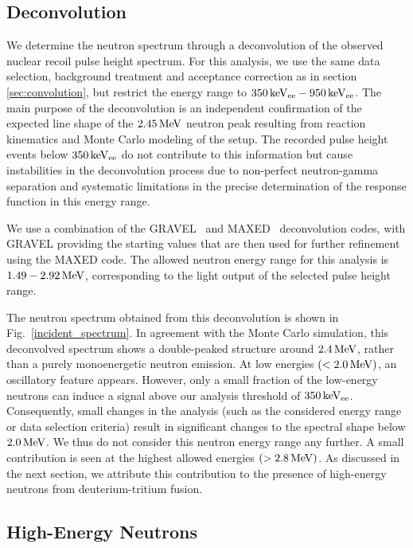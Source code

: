 \subsection{Deconvolution}\label{sec:deconvolution}
We determine the neutron spectrum through a deconvolution of  the observed nuclear recoil pulse height spectrum. For this analysis, we use the same data selection, background treatment and acceptance correction as in section \ref{sec:convolution}, but restrict the energy range to $350\,\mathrm{keV_{ee}}-950\,\mathrm{keV_{ee}}$.
The main purpose of the deconvolution is an independent confirmation of the expected line shape of the $2.45\,\mathrm{MeV}$ neutron peak resulting from reaction kinematics and Monte Carlo modeling of the setup. The recorded pulse height events below $350\,\mathrm{keV_{ee}}$ do not contribute to this information but cause instabilities in the deconvolution process due to non-perfect neutron-gamma separation and systematic limitations in the precise determination of the response function in this energy range.

We use a combination of the GRAVEL~\cite{Matzke:1994} and MAXED~\cite{Reginatto:2002} deconvolution codes, with GRAVEL providing the starting values that are then used for further refinement using the MAXED code. The allowed neutron energy range for this analysis is $1.49 - 2.92\,\mathrm{MeV}$, corresponding to the light output of the selected pulse height range.

The neutron spectrum obtained from this deconvolution is shown in Fig.~\ref{incident_spectrum}. In agreement with the Monte Carlo simulation, this deconvolved spectrum shows a double-peaked structure around $2.4\,\mathrm{MeV}$, rather than a purely monoenergetic neutron emission. At low energies $(<2.0\,\mathrm{MeV})$, an oscillatory feature appears. However, only a small fraction of the low-energy neutrons can induce a signal above our analysis threshold of $350\,\mathrm{keV_{ee}}$. Consequently, small changes in the analysis (such as the considered energy range or data selection criteria) result in significant changes to the spectral shape below $2.0\,\mathrm{MeV}$. We thus do not consider this neutron energy range any further. A small contribution is seen at the highest allowed energies $(>2.8\,\mathrm{MeV})$. As discussed in the next section, we attribute this contribution to the presence of high-energy neutrons from deuterium-tritium fusion.

\subsection{High-Energy Neutrons} \label{sec:he_neutrons}

